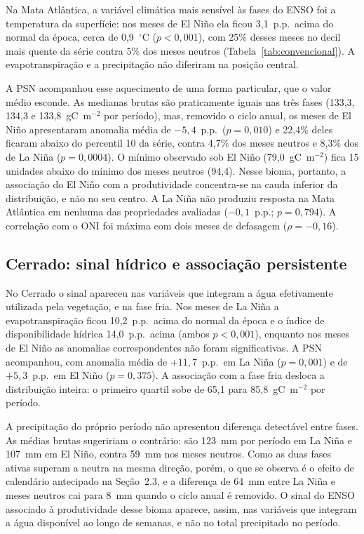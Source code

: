 \documentclass[a4paper,fleqn]{cas-sc}
\begin{document}
Na Mata Atlântica, a variável climática mais sensível às fases do ENSO foi a temperatura da superfície: nos meses de El Niño ela ficou 3,1~p.p.\ acima do normal da época, cerca de 0,9~$^{\circ}$C ($p < 0{,}001$), com 25\% desses meses no decil mais quente da série contra 5\% dos meses neutros (Tabela~\ref{tab:convencional}). A evapotranspiração e a precipitação não diferiram na posição central.

A PSN acompanhou esse aquecimento de uma forma particular, que o valor médio esconde. As medianas brutas são praticamente iguais nas três fases (133,3, 134,3 e 133,8~gC~m$^{-2}$ por período), mas, removido o ciclo anual, os meses de El Niño apresentaram anomalia média de $-5{,}4$~p.p.\ ($p = 0{,}010$) e 22,4\% deles ficaram abaixo do percentil 10 da série, contra 4,7\% dos meses neutros e 8,3\% dos de La Niña ($p = 0{,}0004$). O mínimo observado sob El Niño (79,0~gC~m$^{-2}$) fica 15 unidades abaixo do mínimo dos meses neutros (94,4). Nesse bioma, portanto, a associação do El Niño com a produtividade concentra-se na cauda inferior da distribuição, e não no seu centro. A La Niña não produziu resposta na Mata Atlântica em nenhuma das propriedades avaliadas ($-0{,}1$~p.p.; $p = 0{,}794$). A correlação com o ONI foi máxima com dois meses de defasagem ($\rho = -0{,}16$).

\subsection{Cerrado: sinal hídrico e associação persistente}

No Cerrado o sinal apareceu nas variáveis que integram a água efetivamente utilizada pela vegetação, e na fase fria. Nos meses de La Niña a evapotranspiração ficou 10,2~p.p.\ acima do normal da época e o índice de disponibilidade hídrica 14,0~p.p.\ acima (ambos $p < 0{,}001$), enquanto nos meses de El Niño as anomalias correspondentes não foram significativas. A PSN acompanhou, com anomalia média de $+11{,}7$~p.p.\ em La Niña ($p = 0{,}001$) e de $+5{,}3$~p.p.\ em El Niño ($p = 0{,}375$). A associação com a fase fria desloca a distribuição inteira: o primeiro quartil sobe de 65,1 para 85,8~gC~m$^{-2}$ por período.

A precipitação do próprio período não apresentou diferença detectável entre fases. As médias brutas sugeririam o contrário: são 123~mm por período em La Niña e 107~mm em El Niño, contra 59~mm nos meses neutros. Como as duas fases ativas superam a neutra na mesma direção, porém, o que se observa é o efeito de calendário antecipado na Seção~2.3, e a diferença de 64~mm entre La Niña e meses neutros cai para 8~mm quando o ciclo anual é removido. O sinal do ENSO associado à produtividade desse bioma aparece, assim, nas variáveis que integram a água disponível ao longo de semanas, e não no total precipitado no período.
\end{document}
